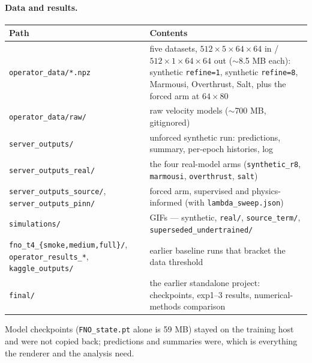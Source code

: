 \documentclass[11pt,a4paper]{article}
\begin{document}
\paragraph{Data and results.}
\begin{center}
\small
\begin{tabular}{@{}>{\raggedright\arraybackslash}p{5.4cm}>{\raggedright\arraybackslash}p{9.7cm}@{}}
\toprule
\textbf{Path} & \textbf{Contents}\\
\midrule
\texttt{operator\_data/*.npz} & five datasets, $512\times5\times64\times64$ in / $512\times1\times64\times64$ out ($\sim$8.5 MB each): synthetic \texttt{refine=1}, synthetic \texttt{refine=8}, Marmousi, Overthrust, Salt, plus the forced arm at $64\times80$\\
\texttt{operator\_data/raw/}  & raw velocity models ($\sim$700 MB, gitignored)\\
\texttt{server\_outputs/}     & unforced synthetic run: predictions, summary, per-epoch histories, log\\
\texttt{server\_outputs\_real/} & the four real-model arms (\texttt{synthetic\_r8}, \texttt{marmousi}, \texttt{overthrust}, \texttt{salt})\\
\texttt{server\_outputs\_source/}, \texttt{server\_outputs\_pinn/} & forced arm, supervised and physics-informed (with \texttt{lambda\_sweep.json})\\
\texttt{simulations/}         & 20 GIFs --- synthetic, \texttt{real/}, \texttt{source\_term/}, \texttt{superseded\_undertrained/}\\
\texttt{fno\_t4\_\{smoke,medium,full\}/}, \texttt{operator\_results\_*}, \texttt{kaggle\_outputs/} & earlier baseline runs that bracket the data threshold\\
\texttt{final/}               & the earlier standalone project: checkpoints, exp1--3 results, numerical-methods comparison\\
\bottomrule
\end{tabular}
\end{center}

Model checkpoints (\texttt{FNO\_state.pt} alone is 59 MB) stayed on the training
host and were not copied back; predictions and summaries were, which is
everything the renderer and the analysis need.
\end{document}
